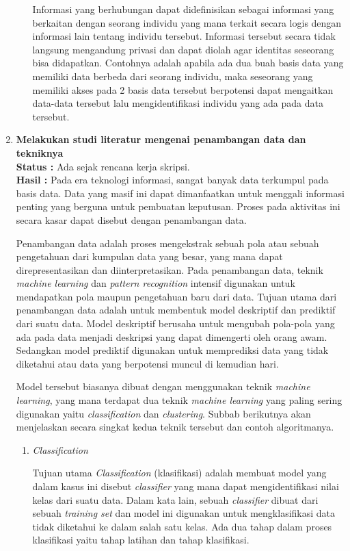 \documentclass[a4paper,twoside]{article}
\begin{document}
\begin{enumerate}
\begin{enumerate}
			Informasi yang berhubungan dapat didefinisikan sebagai informasi yang berkaitan dengan seorang individu yang mana terkait secara logis dengan informasi lain tentang individu tersebut. Informasi tersebut secara tidak langsung mengandung privasi dan dapat diolah agar identitas seseorang bisa didapatkan. Contohnya adalah apabila ada dua buah basis data yang memiliki data berbeda dari seorang individu, maka seseorang yang memiliki akses pada 2 basis data tersebut berpotensi dapat mengaitkan data-data tersebut lalu mengidentifikasi individu yang ada pada data tersebut.
		\end{enumerate}

		\item \textbf{Melakukan studi literatur mengenai penambangan data dan tekniknya}\\
		{\bf Status :} Ada sejak rencana kerja skripsi.\\
		{\bf Hasil :} Pada era teknologi informasi, sangat banyak data terkumpul pada basis data. Data yang masif ini dapat dimanfaatkan untuk menggali informasi penting yang berguna untuk pembuatan keputusan. Proses pada aktivitas ini secara kasar dapat disebut dengan penambangan data.

		Penambangan data adalah proses mengekstrak sebuah pola atau sebuah pengetahuan dari kumpulan data yang besar, yang mana dapat direpresentasikan dan diinterpretasikan. Pada penambangan data, teknik \textit{machine learning} dan \textit{pattern recognition} intensif digunakan untuk mendapatkan pola maupun pengetahuan baru dari data. Tujuan utama dari penambangan data adalah untuk membentuk model deskriptif dan prediktif dari suatu data. Model deskriptif berusaha untuk mengubah pola-pola yang ada pada data menjadi deskripsi yang dapat dimengerti oleh orang awam. Sedangkan model prediktif digunakan untuk memprediksi data yang tidak diketahui atau data yang berpotensi muncul di kemudian hari.
		
		Model tersebut biasanya dibuat dengan menggunakan teknik \textit{machine learning}, yang mana terdapat dua teknik \textit{machine learning} yang paling sering digunakan yaitu \textit{classification} dan \textit{clustering}. Subbab berikutnya akan menjelaskan secara singkat kedua teknik tersebut dan contoh algoritmanya.

		\begin{enumerate}
			\item \textit{Classification}
			
			Tujuan utama \textit{Classification} (klasifikasi) adalah membuat model yang dalam kasus ini disebut \textit{classifier} yang mana dapat mengidentifikasi nilai kelas dari suatu data. Dalam kata lain, sebuah \textit{classifier} dibuat dari sebuah \textit{training set} dan model ini digunakan untuk mengklasifikasi data tidak diketahui ke dalam salah satu kelas. Ada dua tahap dalam proses klasifikasi yaitu tahap latihan dan tahap klasifikasi.


\end{enumerate}
\end{enumerate}
\end{document}
